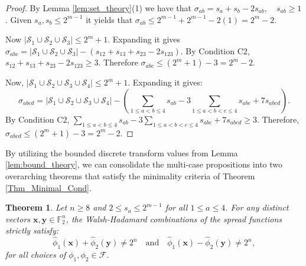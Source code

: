 \documentclass[10pt,a4paper]{amsart}
\newtheorem{theorem}{Theorem}%
\begin{document}
\begin{proof}
By  Lemma \ref{lem:set_theory}(1) we have that  $\sigma_{ab} = s_a + s_b - 2s_{ab}, \quad s_{ab} \geq 1$. 
Given $s_a, s_b \leq 2^{m-1}$ it yields that $\sigma_{ab} \leq 2^{m-1} + 2^{m-1} - 2(1) = 2^m - 2$. 

Now $|\mathcal{S}_1 \cup \mathcal{S}_2 \cup \mathcal{S}_3| \leq 2^m + 1$. 
Expanding it gives  $\sigma_{abc} = |\mathcal{S}_1 \cup \mathcal{S}_2 \cup \mathcal{S}_3| - \left( s_{12} + s_{13} + s_{23} - 2s_{123} \right)$.
By Condition C2, $s_{12} + s_{13} + s_{23} - 2s_{123} \geq 3$. Therefore $\sigma_{abc} \leq (2^m + 1) - 3 = 2^m - 2$. 

Now, $|\mathcal{S}_1 \cup \mathcal{S}_2 \cup \mathcal{S}_3 \cup \mathcal{S}_4| \leq 2^m + 1$. Expanding it gives:
\[
\sigma_{abcd} = |\mathcal{S}_1 \cup \mathcal{S}_2 \cup \mathcal{S}_3 \cup \mathcal{S}_4| - \left( \sum_{1 \le a < b \le 4} s_{ab} - 3 \sum_{1 \le a < b < c \le 4} s_{abc} + 7 s_{abcd} \right).
\]
By Condition C2, $\sum_{1 \le a < b \le 4} s_{ab} - 3 \sum_{1 \le a < b < c \le 4} s_{abc} + 7 s_{abcd} \ge 3$. Therefore, $\sigma_{abcd} \le (2^m + 1) - 3 = 2^m - 2$.
\end{proof}



By utilizing the bounded discrete transform values from Lemma \ref{lem:bound_theory}, we can consolidate the multi-case propositions into two overarching theorems that satisfy the minimality criteria of Theorem \ref{Thm_Minimal_Cond}.




\begin{theorem}\label{Thm_Verify_Cond1}
Let $n \geq 8$ and $2 \leq s_a \leq 2^{m-1}$ for all $1 \leq a \leq 4$. For any distinct vectors $\mathbf{x}, \mathbf{y} \in \mathbb{F}_2^n$, the Walsh-Hadamard combinations of the spread functions strictly satisfy:
\[ \widehat{\phi}_1(\mathbf{x}) + \widehat{\phi}_2(\mathbf{y}) \neq 2^n \quad \text{and} \quad \widehat{\phi}_1(\mathbf{x}) - \widehat{\phi}_2(\mathbf{y}) \neq 2^n, \]
for all choices of $\phi_1, \phi_2 \in \mathcal{F}$.
\end{theorem}
\end{document}
